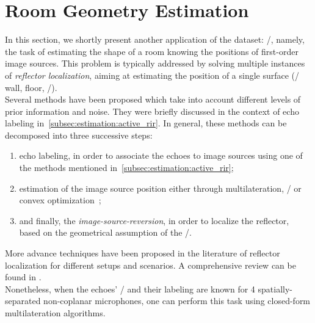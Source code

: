 \section{Room Geometry Estimation}\label{sec:dechorateapp:rooge}
In this section, we shortly present another application of the \dEchorate{} dataset: \RooGEdef/, namely, the task of estimating the shape of a room knowing the positions of first-order image sources.
This problem is typically addressed by solving multiple instances of \textit{reflector localization}, aiming at estimating the position of a single surface (\eg/ wall, floor, \etc/).
\\Several methods have been proposed which take into account different levels of prior information and noise.
They were briefly discussed in the context of echo labeling in~\cref{subsec:estimation:active_rir}.
In general, these methods can be decomposed into three successive steps:
\begin{enumerate}
    \item echo labeling, in order to associate the echoes to image sources using one of the methods mentioned in~\cref{subsec:estimation:active_rir};
    \item estimation of the image source position either through  multilateration, \MLdef/ or convex optimization~;
    \item and finally, the \textit{image-source-reversion}, in order to localize the reflector, based on the geometrical assumption of the \ISMdef/.
\end{enumerate}
More advance techniques have been proposed in the literature of reflector localization for different setups and scenarios.
A comprehensive review can be found in .
\\Nonetheless, when the echoes' \TOAs/ and their labeling are known for 4 spatially-separated non-coplanar microphones, one can perform this task using closed-form multilateration algorithms.

